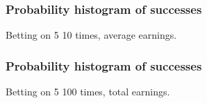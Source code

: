 \documentclass[handout]{beamer}
\begin{document}


   \begin{frame}
   \frametitle{Probability histogram of successes}
   \begin{center}
   \end{center}
   Betting on {\color{red} 5} 10 times, average earnings.
   \end{frame}



   \begin{frame}
   \frametitle{Probability histogram of successes}
   \begin{center}
   \end{center}
   Betting on {\color{red} 5} 100 times,  total earnings.
   \end{frame}

\end{document}
